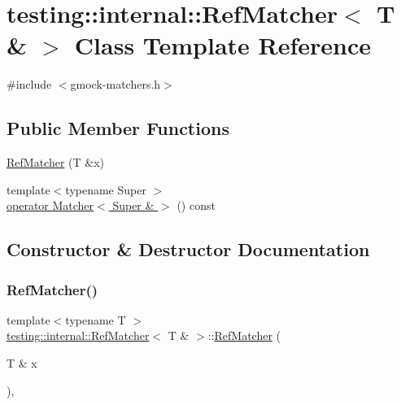 \hypertarget{classtesting_1_1internal_1_1_ref_matcher_3_01_t_01_6_01_4}{}\section{testing\+:\+:internal\+:\+:Ref\+Matcher$<$ T \& $>$ Class Template Reference}
\label{classtesting_1_1internal_1_1_ref_matcher_3_01_t_01_6_01_4}


{\ttfamily \#include $<$gmock-\/matchers.\+h$>$}

\subsection*{Public Member Functions}
\begin{DoxyCompactItemize}
\item 
\hyperlink{classtesting_1_1internal_1_1_ref_matcher_3_01_t_01_6_01_4_a94eaec01f11b3ed704092a62cdb9c21c}{Ref\+Matcher} (T \&x)
\item 
{\footnotesize template$<$typename Super $>$ }\\\hyperlink{classtesting_1_1internal_1_1_ref_matcher_3_01_t_01_6_01_4_ac146f2d10f0b2e361f903225be15d1a9}{operator Matcher$<$ Super \& $>$} () const
\end{DoxyCompactItemize}


\subsection{Constructor \& Destructor Documentation}
\mbox{\label{classtesting_1_1internal_1_1_ref_matcher_3_01_t_01_6_01_4_a94eaec01f11b3ed704092a62cdb9c21c}} 
\subsubsection{\texorpdfstring{Ref\+Matcher()}{RefMatcher()}}
{\footnotesize\ttfamily template$<$typename T $>$ \\
\hyperlink{classtesting_1_1internal_1_1_ref_matcher}{testing\+::internal\+::\+Ref\+Matcher}$<$ T \& $>$\+::\hyperlink{classtesting_1_1internal_1_1_ref_matcher}{Ref\+Matcher} (\begin{DoxyParamCaption}\item[{T \&}]{x }\end{DoxyParamCaption})\hspace{0.3cm}{\ttfamily [inline]}, {\ttfamily [explicit]}}



